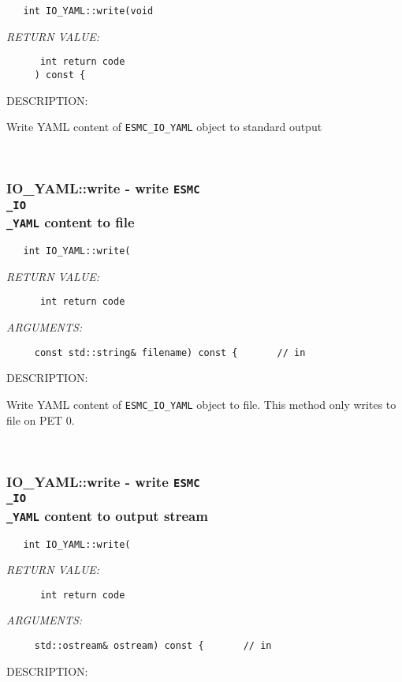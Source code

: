   
\begin{verbatim}   int IO_YAML::write(void\end{verbatim}{\em RETURN VALUE:}
\begin{verbatim}      int return code
     ) const {\end{verbatim}
{\sf DESCRIPTION:\\ }


        Write YAML content of {\tt ESMC\_IO\_YAML} object to standard output
   
 
\mbox{}\hrulefill\
 
\subsubsection [IO\_YAML::write] {IO\_YAML::write - write {\tt ESMC\\_IO\\_YAML} content to file}


  
\begin{verbatim}   int IO_YAML::write(\end{verbatim}{\em RETURN VALUE:}
\begin{verbatim}      int return code\end{verbatim}{\em ARGUMENTS:}
\begin{verbatim}     const std::string& filename) const {       // in
 \end{verbatim}
{\sf DESCRIPTION:\\ }


        Write YAML content of {\tt ESMC\_IO\_YAML} object to file.
        This method only writes to file on PET 0.
   
 
\mbox{}\hrulefill\
 
\subsubsection [IO\_YAML::write] {IO\_YAML::write - write {\tt ESMC\\_IO\\_YAML} content to output stream}


  
\begin{verbatim}   int IO_YAML::write(\end{verbatim}{\em RETURN VALUE:}
\begin{verbatim}      int return code\end{verbatim}{\em ARGUMENTS:}
\begin{verbatim}     std::ostream& ostream) const {       // in
 \end{verbatim}
{\sf DESCRIPTION:\\ }


